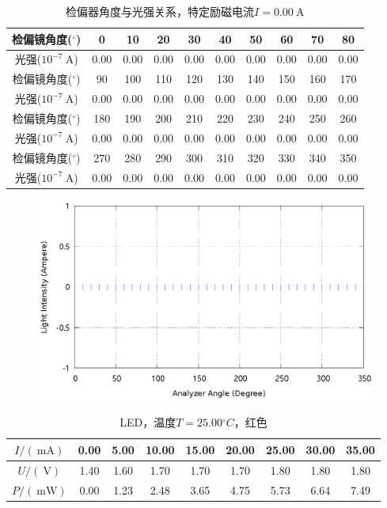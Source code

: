 \documentclass{ctexart}
\newcommand{\si}[1]{\  \mathrm{#1}}
\begin{document}
\newpage
\begin{table}[H]
    \centering
    \begin{tabular}{|c|c|c|c|c|c|c|c|c|c|}
        \hline
        检偏镜角度(${}^{\circ}$)  & 0   & 10  & 20  & 30  & 40  & 50  & 60  & 70  & 80  \\\hline
        光强($10^{-7} \si{A}$) & 0.00 & 0.00 & 0.00 & 0.00 & 0.00 & 0.00 & 0.00 & 0.00 & 0.00 \\\hline
        检偏镜角度(${}^{\circ}$)  & 90  & 100 & 110 & 120 & 130 & 140 & 150 & 160 & 170 \\\hline
        光强($10^{-7} \si{A}$) & 0.00 & 0.00 & 0.00 & 0.00 & 0.00 & 0.00 & 0.00 & 0.00 & 0.00 \\\hline
        检偏镜角度(${}^{\circ}$)  & 180 & 190 & 200 & 210 & 220 & 230 & 240 & 250 & 260 \\\hline
        光强($10^{-7} \si{A}$) & 0.00 & 0.00 & 0.00 & 0.00 & 0.00 & 0.00 & 0.00 & 0.00 & 0.00 \\\hline
        检偏镜角度(${}^{\circ}$)  & 270 & 280 & 290 & 300 & 310 & 320 & 330 & 340 & 350 \\\hline
        光强($10^{-7} \si{A}$) & 0.00 & 0.00 & 0.00 & 0.00 & 0.00 & 0.00 & 0.00 & 0.00 & 0.00 \\\hline
    \end{tabular}
    \caption{检偏器角度与光强关系，特定励磁电流$I=0.00 \si{A}$}
\end{table}
\begin{figure}[H]
    \centering
    \includegraphics[width=0.9\linewidth]{../output/analyzer-angle-light-intensity-2.gnuplot}
\end{figure}
\newpage
\begin{table}[H]
    \centering
    \begin{tabular}{|c|c|c|c|c|c|c|c|c|}
        \hline
        $I/(\si{mA})$ & 0.00 & 5.00 & 10.00 & 15.00 & 20.00 & 25.00 & 30.00 & 35.00 \\\hline
        $U / (\si{V})$  & 1.40 & 1.60 & 1.70 & 1.70 & 1.70 & 1.80 & 1.80 & 1.80 \\\hline
        $P / (\si{mW})$ & 0.00 & 1.23 & 2.48 & 3.65 & 4.75 & 5.73 & 6.64 & 7.49 \\\hline
    \end{tabular}
    \caption{LED，温度$T=25.00{}^{\circ}C$，红色}
\end{table}
\end{document}
